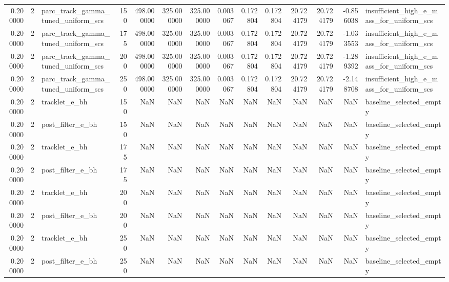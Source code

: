 \begin{tabular}{rrlrrrrrrrrrrl}
0.200000 & 2 & parc_track_gamma_tuned_uniform_scs & 150 & 498.000000 & 325.000000 & 325.000000 & 0.003067 & 0.172804 & 0.172804 & 20.724179 & 20.724179 & -0.856038 & insufficient_high_e_mass_for_uniform_scs \\
0.200000 & 2 & parc_track_gamma_tuned_uniform_scs & 175 & 498.000000 & 325.000000 & 325.000000 & 0.003067 & 0.172804 & 0.172804 & 20.724179 & 20.724179 & -1.033553 & insufficient_high_e_mass_for_uniform_scs \\
0.200000 & 2 & parc_track_gamma_tuned_uniform_scs & 200 & 498.000000 & 325.000000 & 325.000000 & 0.003067 & 0.172804 & 0.172804 & 20.724179 & 20.724179 & -1.289392 & insufficient_high_e_mass_for_uniform_scs \\
0.200000 & 2 & parc_track_gamma_tuned_uniform_scs & 250 & 498.000000 & 325.000000 & 325.000000 & 0.003067 & 0.172804 & 0.172804 & 20.724179 & 20.724179 & -2.148708 & insufficient_high_e_mass_for_uniform_scs \\
0.200000 & 2 & tracklet_e_bh & 150 & NaN & NaN & NaN & NaN & NaN & NaN & NaN & NaN & NaN & baseline_selected_empty \\
0.200000 & 2 & post_filter_e_bh & 150 & NaN & NaN & NaN & NaN & NaN & NaN & NaN & NaN & NaN & baseline_selected_empty \\
0.200000 & 2 & tracklet_e_bh & 175 & NaN & NaN & NaN & NaN & NaN & NaN & NaN & NaN & NaN & baseline_selected_empty \\
0.200000 & 2 & post_filter_e_bh & 175 & NaN & NaN & NaN & NaN & NaN & NaN & NaN & NaN & NaN & baseline_selected_empty \\
0.200000 & 2 & tracklet_e_bh & 200 & NaN & NaN & NaN & NaN & NaN & NaN & NaN & NaN & NaN & baseline_selected_empty \\
0.200000 & 2 & post_filter_e_bh & 200 & NaN & NaN & NaN & NaN & NaN & NaN & NaN & NaN & NaN & baseline_selected_empty \\
0.200000 & 2 & tracklet_e_bh & 250 & NaN & NaN & NaN & NaN & NaN & NaN & NaN & NaN & NaN & baseline_selected_empty \\
0.200000 & 2 & post_filter_e_bh & 250 & NaN & NaN & NaN & NaN & NaN & NaN & NaN & NaN & NaN & baseline_selected_empty \\
\bottomrule
\end{tabular}
